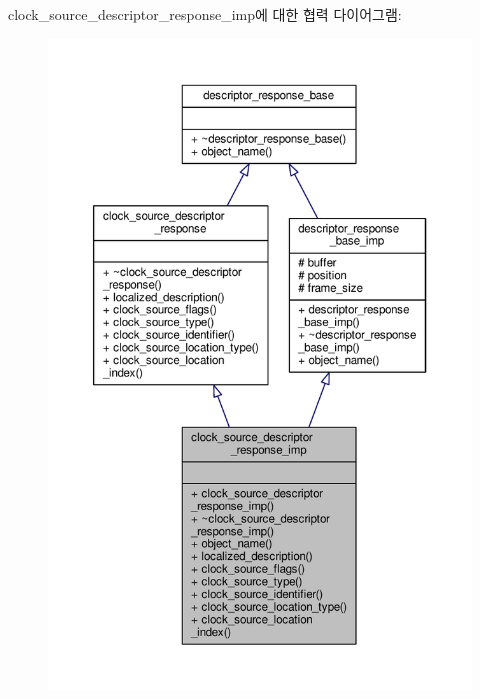 clock\+\_\+source\+\_\+descriptor\+\_\+response\+\_\+imp에 대한 협력 다이어그램\+:
\nopagebreak
\begin{figure}[H]
\begin{center}
\leavevmode
\includegraphics[width=350pt]{classavdecc__lib_1_1clock__source__descriptor__response__imp__coll__graph}
\end{center}
\end{figure}
